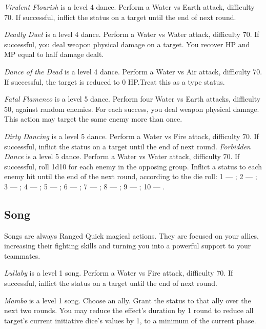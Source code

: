 \begin{multicols}{2}
    \textit{Virulent Flourish} is a level 4 dance. Perform a Water vs Earth attack, difficulty 70. If successful, inflict the  status on a target until the end of next round.
    
    \textit{Deadly Duet} is a level 4 dance. Perform a Water vs Water attack, difficulty 70. If successful, you deal weapon physical damage on a target. You recover HP and MP equal to half damage dealt.
    
    \textit{Dance of the Dead} is a level 4 dance. Perform a Water vs Air attack, difficulty 70. If successful, the target is reduced to 0 HP.\@{}Treat this as a  type status.
    
    \textit{Fatal Flamenco} is a level 5 dance. Perform four Water vs Earth attacks, difficulty 50, against random enemies. For each success, you deal weapon physical damage. This action may target the same enemy more than once.
    
    \textit{Dirty Dancing} is a level 5 dance. Perform a Water vs Fire attack, difficulty 70. If successful, inflict the  status on a target until the end of next round.
	\textit{Forbidden Dance} is a level 5 dance. Perform a Water vs Water attack, difficulty 70. If successful, roll 1d10 for each enemy in the opposing group. Inflict a status to each enemy hit until the end of the next round, according to the die roll: 1 --- ; 2 --- ; 3 --- ; 4 --- ; 5 --- ; 6 --- ; 7 --- ; 8 --- ; 9 --- ; 10 --- .
    

    \subsection{Song}\label{subsec:perf-song}

    Songs are always Ranged Quick magical actions. They are focused on your allies, increasing their fighting skills and turning you into a powerful support to your teammates.
    
    \textit{Lullaby} is a level 1 song. Perform a Water vs Fire attack, difficulty 70. If successful, inflict the  status on a target until the end of next round.
    
    \textit{Mambo} is a level 1 song. Choose an ally. Grant the  status to that ally over the next two rounds. You may reduce the effect's duration by 1 round to reduce all target's current initiative dice's values by 1, to a minimum of the current phase.
    

\end{multicols}
